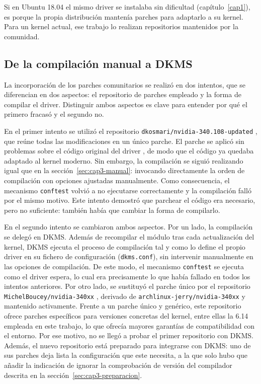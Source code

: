 Si en Ubuntu 18.04 el mismo driver se instalaba sin dificultad (capítulo~\ref{cap1}), es porque la propia 
distribución mantenía parches para adaptarlo a su kernel. Para un kernel actual, ese trabajo lo realizan 
repositorios mantenidos por la comunidad. 

\subsection{De la compilación manual a DKMS} \label{sec:cap3-parches}

La incorporación de los parches comunitarios se realizó en dos intentos, que se diferencian en dos aspectos: el repositorio de parches empleado y la forma de compilar el driver. Distinguir ambos aspectos es clave para entender por qué el primero fracasó y el segundo no.

En el primer intento se utilizó el repositorio \texttt{dkosmari/nvidia-340.108-updated} \cite{dkosmari}, que reúne todas las modificaciones en un único parche. El parche se aplicó sin problemas sobre el código original del driver \cite{nvidia_340_driver_file}, de modo que el código ya quedaba adaptado al kernel moderno. Sin embargo, la compilación se siguió realizando igual que en la sección~\ref{sec:cap3-manual}: invocando directamente la orden de compilación con opciones ajustadas manualmente. Como consecuencia, el mecanismo \texttt{conftest} volvió a no ejecutarse correctamente y la compilación falló por el mismo motivo. Este intento demostró que parchear el código era necesario, pero no suficiente: también había que cambiar la forma de compilarlo.

En el segundo intento se cambiaron ambos aspectos. Por un lado, la compilación se delegó en DKMS. Además de recompilar el módulo tras cada actualización del kernel, DKMS ejecuta el proceso de compilación tal y como lo define el propio driver en su fichero de configuración (\texttt{dkms.conf}), sin intervenir manualmente en las opciones de compilación. De este modo, el mecanismo \texttt{conftest} se ejecuta como el driver espera, lo cual era precisamente lo que había fallado en todos los intentos anteriores. Por otro lado, se sustituyó el parche único por el repositorio \texttt{MichelBoucey/nvidia-340xx} \cite{michelboucey}, derivado de \texttt{archlinux-jerry/nvidia-340xx} \cite{archlinuxjerry} y mantenido activamente. Frente a un parche único y genérico, este repositorio ofrece parches específicos para versiones concretas del kernel, entre ellas la 6.14 empleada en este trabajo, lo que ofrecía mayores garantías de compatibilidad con el entorno. Por ese motivo, no se llegó a probar el primer repositorio con DKMS. Además, el nuevo repositorio está preparado para integrarse con DKMS: uno de sus parches deja lista la configuración que este necesita, a la que solo hubo que añadir la indicación de ignorar la comprobación de versión del compilador descrita en la sección~\ref{sec:cap3-preparacion}.

